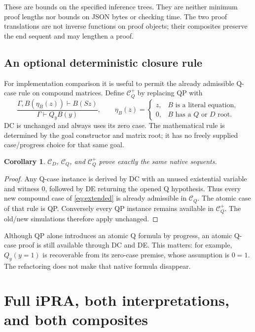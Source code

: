 \documentclass[11pt]{article}
\newtheorem{corollary}[theorem]{Corollary}
\theoremstyle{definition}
\newcommand{\CD}{\mathcal C_D}
\newcommand{\CQ}{\mathcal C_Q}
\newcommand{\CQp}{\mathcal C_Q^{+}}
\begin{document}
These are bounds on the specified inference trees. They are neither minimum
proof lengths nor bounds on JSON bytes or checking time. The two proof
translations are not inverse functions on proof objects; their composites
preserve the end sequent and may lengthen a proof.

\subsection{An optional deterministic closure rule}

For implementation comparison it is useful to permit the already admissible
Q-case rule on compound matrices. Define $\CQp$ by replacing QP with
\begin{equation}
 \frac{\Gamma,B(\eta_B(z))\vdash B(Sz)}
      {\Gamma\vdash Q_yB(y)},\qquad
 \eta_B(z)=
 \begin{cases}
    z,&B\text{ is a literal equation},\\
    0,&B\text{ has a }Q\text{ or }D\text{ root}.
 \end{cases}
 \label{eq:extended}
\end{equation}
DC is unchanged and always uses its zero case. The mathematical rule is
determined by the goal constructor and matrix root; it has no freely supplied
case/progress choice for that same goal.

\begin{corollary}
$\CD$, $\CQ$, and $\CQp$ prove exactly the same native sequents.
\end{corollary}
\begin{proof}
Any Q-case instance is derived by DC with an unused existential variable and
witness $0$, followed by DE returning the opened Q hypothesis. Thus every
new compound case of \eqref{eq:extended} is already admissible in $\CQ$.
The atomic case of that rule is QP. Conversely every QP instance remains
available in $\CQp$. The old/new simulations therefore apply unchanged.
\end{proof}

Although QP alone introduces an atomic Q formula by progress, an atomic
Q-case proof is still available through DC and DE. This matters: for example,
$Q_y(y=1)$ is recoverable from its zero-case premise, whose assumption is
$0=1$. The refactoring does not make that native formula disappear.

\section{Full iPRA, both interpretations, and both composites}
\label{sec:biinterp}
\end{document}
